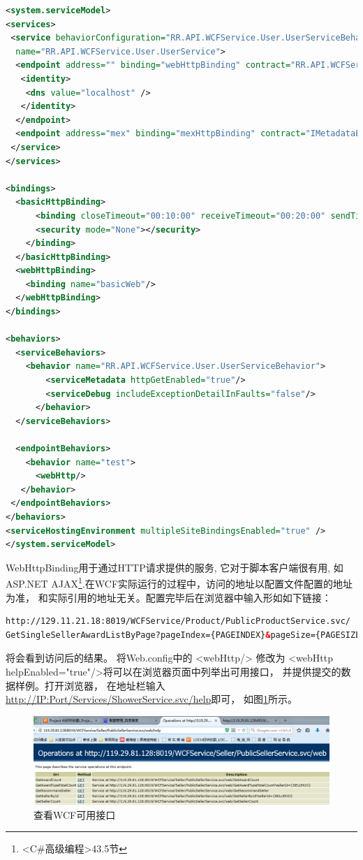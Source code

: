 \documentclass{book}
\begin{document}
\begin{lstlisting}[language=XML]
<system.serviceModel>
<services>
 <service behaviorConfiguration="RR.API.WCFService.User.UserServiceBehavior"
  name="RR.API.WCFService.User.UserService">
  <endpoint address="" binding="webHttpBinding" contract="RR.API.WCFService.User.IUserService" behaviorConfiguration="test" bindingConfiguration="basicWeb">
   <identity>
    <dns value="localhost" />
   </identity>
  </endpoint>
  <endpoint address="mex" binding="mexHttpBinding" contract="IMetadataExchange" />
 </service>
</services>

<bindings>
  <basicHttpBinding>
      <binding closeTimeout="00:10:00" receiveTimeout="00:20:00" sendTimeout="00:20:00" maxBufferSize="20000000" maxReceivedMessageSize="20000000">
      <security mode="None"></security>
    </binding>
  </basicHttpBinding>
  <webHttpBinding>
    <binding name="basicWeb"/>
  </webHttpBinding>
</bindings>

<behaviors>
  <serviceBehaviors>
    <behavior name="RR.API.WCFService.User.UserServiceBehavior">          
        <serviceMetadata httpGetEnabled="true"/>
        <serviceDebug includeExceptionDetailInFaults="false"/>
      </behavior>
  </serviceBehaviors>
  
  <endpointBehaviors>
    <behavior name="test">
      <webHttp/>
   </behavior>
 </endpointBehaviors>
</behaviors>
<serviceHostingEnvironment multipleSiteBindingsEnabled="true" />
</system.serviceModel>
\end{lstlisting}

WebHttpBinding用于通过HTTP请求提供的服务,
它对于脚本客户端很有用,
如ASP.NET AJAX\footnote{<C\#高级编程>43.5节}.在WCF实际运行的过程中，访问的地址以配置文件配置的地址为准，
和实际引用的地址无关。配置完毕后在浏览器中输入形如如下链接：

\begin{lstlisting}[language=XML]
http://129.11.21.18:8019/WCFService/Product/PublicProductService.svc/
GetSingleSellerAwardListByPage?pageIndex={PAGEINDEX}&pageSize={PAGESIZE}&count={COUNT}&sellerId={SELLERID}
\end{lstlisting}

将会看到访问后的结果。
将Web.config中的 <webHttp/> 修改为 <webHttp helpEnabled="true"/>将可以在浏览器页面中列举出可用接口，
并提供提交的数据样例。打开浏览器，
在地址栏输入\url{http://IP:Port/Services/ShowerService.svc/help}即可，
如图\ref{fig:WCFInterfaceHelpPage}所示。

\begin{figure}[htbp]
	\centering
	\includegraphics[scale=0.6]{WCFInterfaceHelpPage.jpg}
	\caption{查看WCF可用接口}
	\label{fig:WCFInterfaceHelpPage}
\end{figure}
\end{document}
